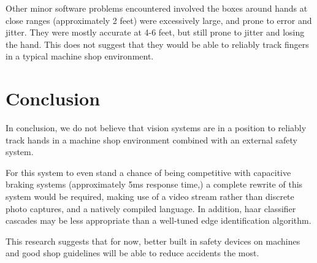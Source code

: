 \documentclass[12pt]{article}
\begin{document}
Other minor software problems encountered involved the boxes around hands at close ranges (approximately 2 feet) were excessively large, and prone to error and jitter. They were mostly accurate at 4-6 feet, but still prone to jitter and losing the hand. This does not suggest that they would be able to reliably track fingers in a typical machine shop environment.

\section{Conclusion}
In conclusion, we do not believe that vision systems are in a position to reliably track hands in a machine shop environment combined with an external safety system.

For this system to even stand a chance of being competitive with capacitive braking systems (approximately 5ms response time,) a complete rewrite of this system would be required, making use of a video stream rather than discrete photo captures, and a natively compiled language. In addition, haar classifier cascades may be less appropriate than a well-tuned edge identification algorithm.

This research suggests that for now, better built in safety devices on machines and good shop guidelines will be able to reduce accidents the most.



\end{document}
